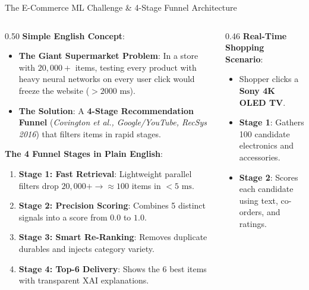 \documentclass[10pt]{beamer}
\begin{document}
\begin{frame}{The E-Commerce ML Challenge \& 4-Stage Funnel Architecture}
\begin{columns}[T]
    \begin{column}{0.50\textwidth}
        {\color{brandred}\textbf{Simple English Concept}}:
        \begin{itemize}\scriptsize
            \item \textbf{The Giant Supermarket Problem}: In a store with $20,000+$ items, testing every product with heavy neural networks on every user click would freeze the website ($>2000\text{ ms}$).
            \item \textbf{The Solution}: A \textbf{4-Stage Recommendation Funnel} (\textit{Covington et al., Google/YouTube, RecSys 2016}) that filters items in rapid stages.
        \end{itemize}
        {\color{brandorange}\textbf{The 4 Funnel Stages in Plain English}}:
        \begin{enumerate}\scriptsize
            \item \textbf{Stage 1: Fast Retrieval}: Lightweight parallel filters drop $20,000+ \to \approx 100$ items in $<5\text{ ms}$.
            \item \textbf{Stage 2: Precision Scoring}: Combines 5 distinct signals into a score from $0.0$ to $1.0$.
            \item \textbf{Stage 3: Smart Re-Ranking}: Removes duplicate durables and injects category variety.
            \item \textbf{Stage 4: Top-6 Delivery}: Shows the 6 best items with transparent XAI explanations.
        \end{enumerate}
    \end{column}%
    \begin{column}{0.46\textwidth}
        {\color{brandred}\textbf{Real-Time Shopping Scenario}}:
        \begin{itemize}\scriptsize
            \item Shopper clicks a \textbf{Sony 4K OLED TV}.
            \item \textbf{Stage 1}: Gathers 100 candidate electronics and accessories.
            \item \textbf{Stage 2}: Scores each candidate using text, co-orders, and ratings.

\end{itemize}
\end{column}
\end{columns}
\end{frame}
\end{document}

